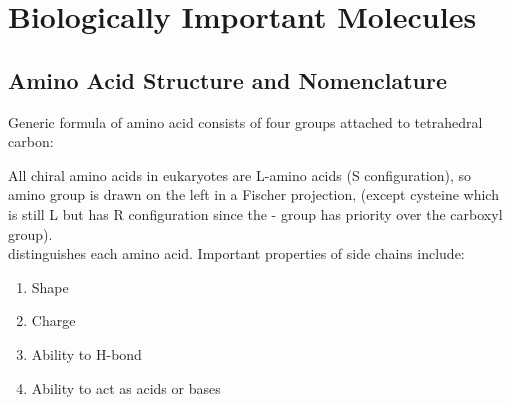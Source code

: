 \documentclass[../Bio_chemistryReview.tex]{subfiles}
\begin{document}
\chapter{Biologically Important Molecules}
	
\section{Amino Acid Structure and Nomenclature}

Generic formula of amino acid consists of four groups attached to tetrahedral carbon:
\begin{center}
  \setatomsep{2.3em}
  \setcrambond{4pt}{}{}
\end{center}
All chiral amino acids in eukaryotes are L-amino acids (S configuration), so
amino group is drawn on the left in a Fischer projection, (except cysteine which
is still L but has R configuration since the - group has
priority over the carboxyl group).\\ 
 distinguishes each amino
acid. Important properties of side chains include:
\begin{enumerate}
  \item Shape
  \item Charge
  \item Ability to H-bond
  \item Ability to act as acids or bases
\end{enumerate}
\end{document}
